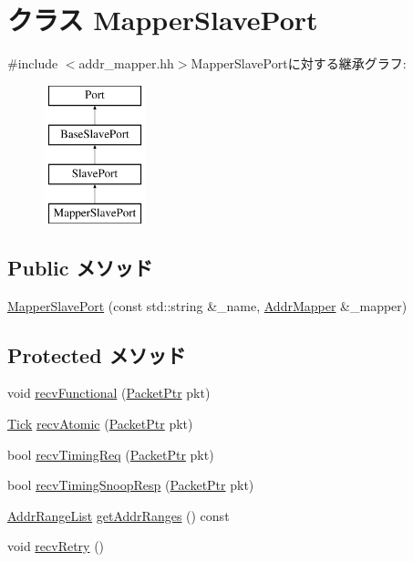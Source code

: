 \hypertarget{classAddrMapper_1_1MapperSlavePort}{
\section{クラス MapperSlavePort}
\label{classAddrMapper_1_1MapperSlavePort}
}


{\ttfamily \#include $<$addr\_\-mapper.hh$>$}MapperSlavePortに対する継承グラフ:\begin{figure}[H]
\begin{center}
\leavevmode
\includegraphics[height=4cm]{classAddrMapper_1_1MapperSlavePort}
\end{center}
\end{figure}
\subsection*{Public メソッド}
\begin{DoxyCompactItemize}
\item 
\hyperlink{classAddrMapper_1_1MapperSlavePort_aefcc8bd233b4c0e73a6cffe788ace480}{MapperSlavePort} (const std::string \&\_\-name, \hyperlink{classAddrMapper_1_1AddrMapper}{AddrMapper} \&\_\-mapper)
\end{DoxyCompactItemize}
\subsection*{Protected メソッド}
\begin{DoxyCompactItemize}
\item 
void \hyperlink{classAddrMapper_1_1MapperSlavePort_aeefa907fb6d6a787e6dab90e8138ea90}{recvFunctional} (\hyperlink{classPacket}{PacketPtr} pkt)
\item 
\hyperlink{base_2types_8hh_a5c8ed81b7d238c9083e1037ba6d61643}{Tick} \hyperlink{classAddrMapper_1_1MapperSlavePort_a5f0b4c4a94f6b0053f9d7a4eb9c2518a}{recvAtomic} (\hyperlink{classPacket}{PacketPtr} pkt)
\item 
bool \hyperlink{classAddrMapper_1_1MapperSlavePort_a3344d9dd0f83257feab5424e761f31c6}{recvTimingReq} (\hyperlink{classPacket}{PacketPtr} pkt)
\item 
bool \hyperlink{classAddrMapper_1_1MapperSlavePort_a9b643d565edc21dac11ce15a560238a7}{recvTimingSnoopResp} (\hyperlink{classPacket}{PacketPtr} pkt)
\item 
\hyperlink{classstd_1_1list}{AddrRangeList} \hyperlink{classAddrMapper_1_1MapperSlavePort_a36cf113d5e5e091ebddb32306c098fae}{getAddrRanges} () const 
\item 
void \hyperlink{classAddrMapper_1_1MapperSlavePort_a29cb5a4f98063ce6e9210eacbdb35298}{recvRetry} ()
\end{DoxyCompactItemize}

